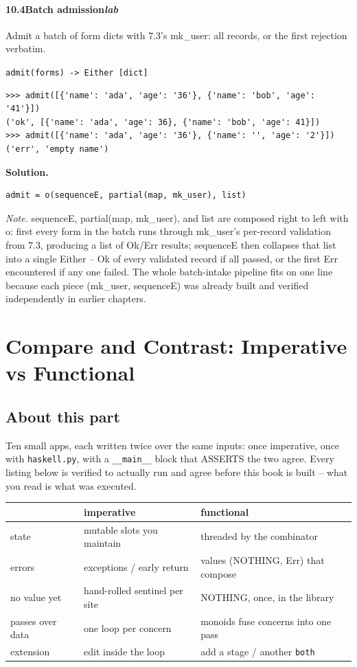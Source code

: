 \documentclass[10pt,letterpaper]{book}
\begin{document}
\subsection*{10.4\quad Batch admission\hfill\textnormal{\textit{lab}}}
Admit a batch of form dicts with 7.3's mk\_user: all records, or the first rejection verbatim.

\noindent\texttt{admit(forms) -> Either [dict]}
\begin{lstlisting}[style=ex]
>>> admit([{'name': 'ada', 'age': '36'}, {'name': 'bob', 'age': '41'}])
('ok', [{'name': 'ada', 'age': 36}, {'name': 'bob', 'age': 41}])
>>> admit([{'name': 'ada', 'age': '36'}, {'name': '', 'age': '2'}])
('err', 'empty name')
\end{lstlisting}
\noindent\textbf{Solution.}
\begin{lstlisting}[style=code]
admit = o(sequenceE, partial(map, mk_user), list)
\end{lstlisting}
\noindent\textit{Note.} sequenceE, partial(map, mk\_user), and list are composed right to left with o: first every form in the batch runs through mk\_user's per-record validation from 7.3, producing a list of Ok/Err results; sequenceE then collapses that list into a single Either -- Ok of every validated record if all passed, or the first Err encountered if any one failed. The whole batch-intake pipeline fits on one line because each piece (mk\_user, sequenceE) was already built and verified independently in earlier chapters.

\clearpage
\part{Compare and Contrast: Imperative vs Functional}
\chapter*{About this part}
Ten small apps, each written twice over the same inputs: once imperative,
once with \texttt{haskell.py}, with a \texttt{\_\_main\_\_} block that
ASSERTS the two agree. Every listing below is verified to actually run and
agree before this book is built -- what you read is what was executed.

\begin{center}\small
\begin{tabular}{@{}p{}p{}p{}@{}}
\toprule
& \textbf{imperative} & \textbf{functional} \\
\midrule
state & mutable slots you maintain & threaded by the combinator \\
errors & exceptions / early return & values (NOTHING, Err) that compose \\
no value yet & hand-rolled sentinel per site & NOTHING, once, in the library \\
passes over data & one loop per concern & monoids fuse concerns into one pass \\
extension & edit inside the loop & add a stage / another \texttt{both} \\
\bottomrule
\end{tabular}
\end{center}
\end{document}
